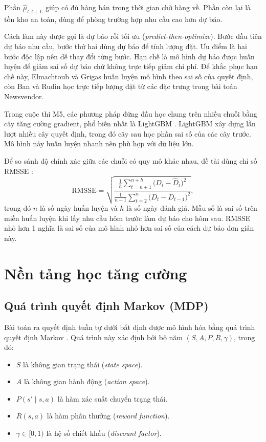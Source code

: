 Phần $\hat{\mu}_{t:t+L}$ giúp có đủ hàng bán trong thời gian chờ hàng về. Phần còn lại là tồn kho an toàn, dùng để phòng trường hợp nhu cầu cao hơn dự báo.

Cách làm này được gọi là dự báo rồi tối ưu (\textit{predict-then-optimize}). Bước đầu tiên dự báo nhu cầu, bước thứ hai dùng dự báo để tính lượng đặt. Ưu điểm là hai bước độc lập nên dễ thay đổi từng bước. Hạn chế là mô hình dự báo được huấn luyện để giảm sai số dự báo chứ không trực tiếp giảm chi phí. Để khắc phục hạn chế này, Elmachtoub và Grigas \cite{elmachtoub2022} huấn luyện mô hình theo sai số của quyết định, còn Ban và Rudin \cite{banrudin2019} học trực tiếp lượng đặt từ các đặc trưng trong bài toán Newsvendor.

Trong cuộc thi M5, các phương pháp đứng đầu học chung trên nhiều chuỗi bằng cây tăng cường gradient, phổ biến nhất là LightGBM \parencite{makridakis2022accuracy}. LightGBM \parencite{ke2017lightgbm} xây dựng lần lượt nhiều cây quyết định, trong đó cây sau học phần sai số của các cây trước. Mô hình này huấn luyện nhanh nên phù hợp với dữ liệu lớn.

Để so sánh độ chính xác giữa các chuỗi có quy mô khác nhau, đề tài dùng chỉ số RMSSE \parencite{makridakis2022background}:
\begin{equation}
    \text{RMSSE} = \sqrt{
    \frac{\frac{1}{h}\sum_{t=n+1}^{n+h} \bigl(D_t - \hat{D}_t\bigr)^2}
         {\frac{1}{n-1}\sum_{t=2}^{n} \bigl(D_t - D_{t-1}\bigr)^2}},
    \label{eq:rmsse}
\end{equation}
trong đó $n$ là số ngày huấn luyện và $h$ là số ngày đánh giá. Mẫu số là sai số trên miền huấn luyện khi lấy nhu cầu hôm trước làm dự báo cho hôm sau. RMSSE nhỏ hơn 1 nghĩa là sai số của mô hình nhỏ hơn sai số của cách dự báo đơn giản này.

\section{Nền tảng học tăng cường}
\label{sec:nenTangRL}

\subsection{Quá trình quyết định Markov (MDP)}
\label{subsec:mdp}

Bài toán ra quyết định tuần tự dưới bất định được mô hình hóa bằng quá trình quyết định Markov \parencite{puterman1994}. Quá trình này xác định bởi bộ năm $(S, A, P, R, \gamma)$, trong đó:
\begin{itemize}
    \item $S$ là không gian trạng thái (\textit{state space}).
    \item $A$ là không gian hành động (\textit{action space}).
    \item $P(s' \mid s, a)$ là hàm xác suất chuyển trạng thái.
    \item $R(s, a)$ là hàm phần thưởng (\textit{reward function}).
    \item $\gamma \in [0, 1)$ là hệ số chiết khấu (\textit{discount factor}).
\end{itemize}

